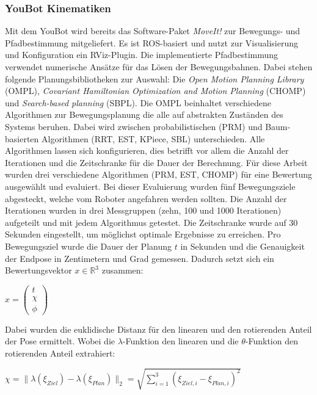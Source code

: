 \subsubsection{YouBot Kinematiken}
Mit dem YouBot wird bereits das Software-Paket \textit{MoveIt!} zur Bewegungs- und Pfadbestimmung mitgeliefert. Es ist ROS-basiert und nutzt zur Visualisierung und Konfiguration ein RViz-Plugin. Die implementierte Pfadbestimmung verwendet numerische Ansätze für das Lösen der Bewegungsbahnen. Dabei stehen folgende Planungsbibliotheken zur Auswahl: Die \textit{Open Motion Planning Library} (OMPL), \textit{Covariant Hamiltonian Optimization and Motion Planning} (CHOMP) und \textit{Search-based planning} (SBPL). Die OMPL beinhaltet verschiedene Algorithmen zur Bewegungsplanung die alle auf abstrakten Zuständen des Systems beruhen. Dabei wird zwischen probabilistischen (PRM) und Baum-basierten Algorithmen (RRT, EST, KPiece, SBL) unterschieden. Alle Algorithmen lassen sich konfigurieren, dies betrifft vor allem die Anzahl der Iterationen und die Zeitschranke für die Dauer der Berechnung. Für diese Arbeit wurden drei verschiedene Algorithmen (PRM, EST, CHOMP) für eine Bewertung ausgewählt und evaluiert. Bei dieser Evaluierung wurden fünf Bewegungsziele abgesteckt, welche vom Roboter angefahren werden sollten. Die Anzahl der Iterationen wurden in drei Messgruppen (zehn, 100 und 1000 Iterationen) aufgeteilt und mit jedem Algorithmus getestet. Die Zeitschranke wurde auf 30 Sekunden eingestellt, um möglichst optimale Ergebnisse zu erreichen. Pro Bewegungsziel wurde die Dauer der Planung $t$ in Sekunden und die Genauigkeit der Endpose in Zentimetern und Grad gemessen. Dadurch setzt sich ein Bewertungsvektor $x \in  \mathbb{R}^3$ zusammen:

\begin{math}
	x = \left(\begin{array}{c} t \\ \chi \\ \phi \end{array}\right)	
\end{math}

Dabei wurden die euklidische Distanz für den linearen und den rotierenden Anteil der Pose ermittelt. Wobei die $\lambda$-Funktion den linearen und die $\theta$-Funktion den rotierenden Anteil extrahiert: 

\begin{math}
	\chi = \|\lambda(\xi_{Ziel}) - \lambda(\xi_{Plan})\|_2 = \sqrt{\sum_{i=1}^{3}(\xi_{Ziel,i}-\xi_{Plan,i})^2}	
\end{math}


